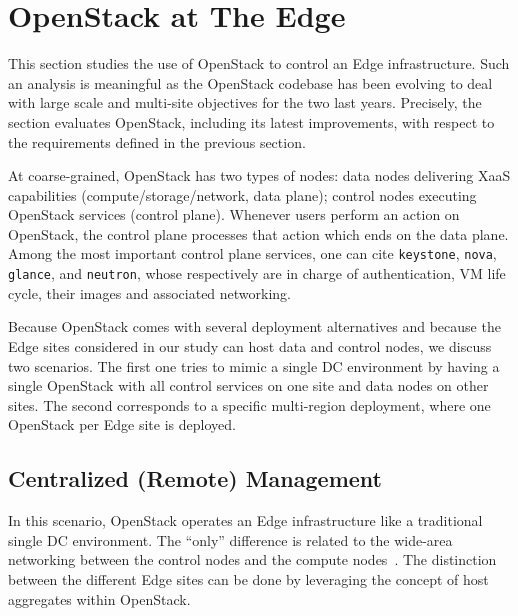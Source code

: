 \section{OpenStack at The Edge}
\label{sec:system_design_considerations}
%
This section studies the use of OpenStack to control an Edge
infrastructure. Such an analysis is meaningful as the OpenStack
codebase has been evolving to deal with large scale and multi-site
objectives for the two last years. Precisely, the section evaluates
OpenStack, including its latest improvements, with respect to the requirements
defined in the previous section.


At coarse-grained, OpenStack has two types of nodes: data nodes
delivering XaaS capabilities (compute/storage/network, \ie data
plane); control nodes executing OpenStack services (\ie control
plane). Whenever users perform an action on OpenStack, the control
plane processes that action which ends on the data plane.  Among the
most important control plane services, one can cite \verb|keystone|,
\verb|nova|, \verb|glance|, and \verb|neutron|, whose respectively are
in charge of authentication, VM life cycle, their images and
associated networking.

Because OpenStack comes with several deployment alternatives and
because the Edge sites considered in our study can host data and
control nodes, we discuss two scenarios. The first one tries to mimic a
single DC environment by having a single OpenStack with all control
services on one site and data nodes on other sites.  The second
corresponds to a specific multi-region deployment, where one OpenStack
per Edge site is deployed.

\subsection{Centralized (Remote) Management}
\label{subsec:centralized_os}
In this scenario, OpenStack operates an Edge infrastructure
like a traditional single DC environment. %
The ``only'' difference is
related to the wide-area networking between the control nodes
and the compute nodes~\cite{www:openstack-wanwide}. The distinction between the different Edge
sites can be done by leveraging the concept of host aggregates
within OpenStack.

